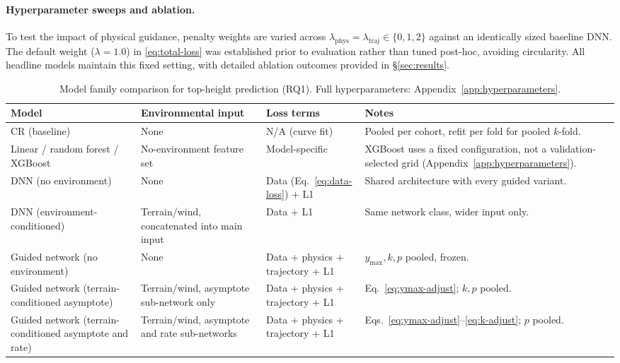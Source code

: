 \paragraph*{Hyperparameter sweeps and ablation.}
To test the impact of physical guidance, penalty weights are varied across $\lambda_{\text{phys}} = \lambda_{\text{traj}} \in \{0, 1, 2\}$ against an identically sized baseline DNN. The default weight ($\lambda = 1.0$) in \eqref{eq:total-loss} was established prior to evaluation rather than tuned post-hoc, avoiding circularity. All headline models maintain this fixed setting, with detailed ablation outcomes provided in \S\ref{sec:results}.
\begin{table}[!htbp]
\scriptsize
\renewcommand{\arraystretch}{1.2}
\begin{tabular}{p{3.2cm}p{3cm}p{2.6cm}p{4.5cm}}
\toprule
Model & Environmental input & Loss terms & Notes \\
\midrule
CR (baseline) & None & N/A (curve fit) & Pooled per cohort, refit per fold for pooled $k$-fold. \\
Linear / random forest / XGBoost & No-environment feature set & Model-specific & XGBoost uses a
fixed configuration, not a validation-selected grid (Appendix~\ref{app:hyperparameters}). \\
DNN (no environment) & None & Data (Eq.~\ref{eq:data-loss}) + L1 & Shared architecture with every
guided variant. \\
DNN (environment-conditioned) & Terrain/wind, concatenated into main input & Data + L1 & Same
network class, wider input only. \\
Guided network (no environment) & None & Data + physics + trajectory + L1 & $y_{\max},k,p$
pooled, frozen. \\
Guided network (terrain-conditioned asymptote) & Terrain/wind, asymptote sub-network only & Data +
physics + trajectory + L1 & Eq.~\ref{eq:ymax-adjust}; $k,p$ pooled. \\
Guided network (terrain-conditioned asymptote and rate) & Terrain/wind, asymptote and rate
sub-networks & Data + physics + trajectory + L1 & Eqs.~\ref{eq:ymax-adjust}--\ref{eq:k-adjust};
$p$ pooled. \\
\bottomrule
\end{tabular}
\caption{Model family comparison for top-height prediction (RQ1). Full hyperparameters:
Appendix~\ref{app:hyperparameters}.}
\label{tab:rq1-models}
\end{table}

